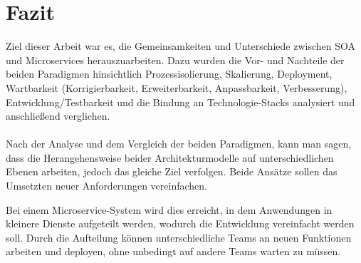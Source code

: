 \chapter{Fazit}
\label{chap:Fazit}
Ziel dieser Arbeit war es, die Gemeinsamkeiten und Unterschiede zwischen SOA und Microservices herauszuarbeiten. Dazu wurden die Vor- und Nachteile der beiden Paradigmen hinsichtlich Prozessisolierung, Skalierung, Deployment, Wartbarkeit (Korrigierbarkeit, Erweiterbarkeit, Anpassbarkeit, Verbesserung), Entwicklung/Testbarkeit und die Bindung an Technologie-Stacks analysiert und anschließend verglichen.
\\\\
Nach der Analyse und dem Vergleich der beiden Paradigmen, kann man sagen, dass die Herangehensweise beider Architekturmodelle auf unterschiedlichen Ebenen arbeiten, jedoch das gleiche Ziel verfolgen. Beide Ansätze sollen das Umsetzten neuer Anforderungen vereinfachen.

Bei einem Microservice-System wird dies erreicht, in dem Anwendungen in kleinere Dienste aufgeteilt werden, wodurch die Entwicklung vereinfacht werden soll. Durch die Aufteilung können unterschiedliche Teams an neuen Funktionen arbeiten und deployen, ohne unbedingt auf andere Teams warten zu müssen.


